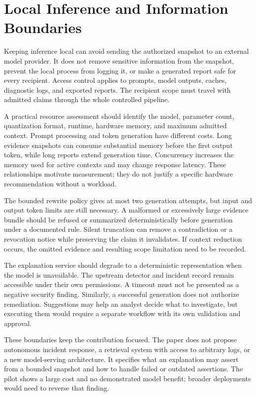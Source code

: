 \documentclass[conference,letterpaper]{IEEEtran}
\begin{document}
\section{Local Inference and Information Boundaries}
Keeping inference local can avoid sending the authorized snapshot to an external model provider. It does not remove sensitive information from the snapshot, prevent the local process from logging it, or make a generated report safe for every recipient. Access control applies to prompts, model outputs, caches, diagnostic logs, and exported reports. The recipient scope must travel with admitted claims through the whole controlled pipeline.

A practical resource assessment should identify the model, parameter count, quantization format, runtime, hardware memory, and maximum admitted context. Prompt processing and token generation have different costs. Long evidence snapshots can consume substantial memory before the first output token, while long reports extend generation time. Concurrency increases the memory used for active contexts and may change response latency. These relationships motivate measurement; they do not justify a specific hardware recommendation without a workload.

The bounded rewrite policy gives at most two generation attempts, but input and output token limits are still necessary. A malformed or excessively large evidence bundle should be refused or summarized deterministically before generation under a documented rule. Silent truncation can remove a contradiction or a revocation notice while preserving the claim it invalidates. If context reduction occurs, the omitted evidence and resulting scope limitation need to be recorded.

The explanation service should degrade to a deterministic representation when the model is unavailable. The upstream detector and incident record remain accessible under their own permissions. A timeout must not be presented as a negative security finding. Similarly, a successful generation does not authorize remediation. Suggestions may help an analyst decide what to investigate, but executing them would require a separate workflow with its own validation and approval.

These boundaries keep the contribution focused. The paper does not propose autonomous incident response, a retrieval system with access to arbitrary logs, or a new model-serving architecture. It specifies what an explanation may assert from a bounded snapshot and how to handle failed or outdated assertions. The pilot shows a large cost and no demonstrated model benefit; broader deployments would need to reverse that finding.
\end{document}
